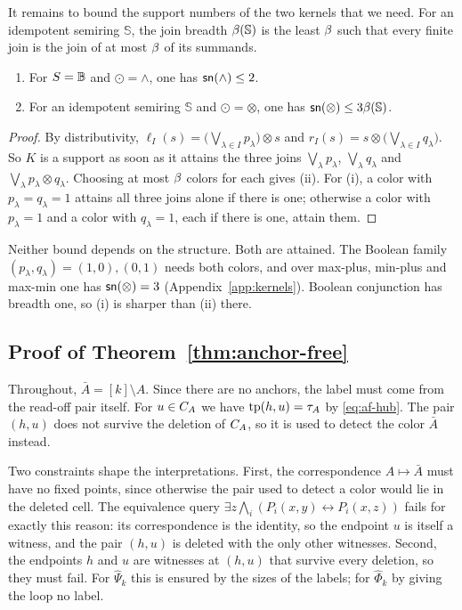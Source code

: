 It remains to bound the support numbers of the two kernels that we need.
For an idempotent semiring $\mathbb S$, the join breadth
$\beta(\mathbb S)$ is the least $\beta$ such that every finite join
is the join of at most $\beta$ of its summands.

\begin{lemma}\label{lem:af-width}
\begin{enumerate}[nosep,label=(\roman*)]
\item For $S=\mathbb B$ and $\odot=\land$, one has $\mathsf{sn}(\land)\le2$.
\item For an idempotent semiring $\mathbb S$ and $\odot=\otimes$, one has
 $\mathsf{sn}(\otimes)\le3\beta(\mathbb S)$.
\end{enumerate}
\end{lemma}
\begin{proof}
By distributivity, $\ell_I(s)=\bigl(\bigvee_{\lambda\in I}p_\lambda\bigr)
\otimes s$ and $r_I(s)=s\otimes\bigl(\bigvee_{\lambda\in I}q_\lambda\bigr)$.
So $K$ is a support as soon as it attains the three joins
$\bigvee_\lambda p_\lambda$, $\bigvee_\lambda q_\lambda$ and
$\bigvee_\lambda p_\lambda\otimes q_\lambda$. Choosing at most $\beta$
colors for each gives (ii). For (i), a color with
$p_\lambda=q_\lambda=1$ attains all three joins alone if there is one;
otherwise a color with $p_\lambda=1$ and a color with $q_\lambda=1$, each
if there is one, attain them.
\end{proof}
Neither bound depends on the structure. Both are attained. The Boolean
family $(p_\lambda,q_\lambda)=(1,0),(0,1)$ needs both colors, and over
max-plus, min-plus and max-min one has $\mathsf{sn}(\otimes)=3$
(Appendix~\ref{app:kernels}). Boolean conjunction has breadth one, so (i)
is sharper than (ii) there.

\subsection{Proof of Theorem~\ref{thm:anchor-free}}\label{app:af-proof}
Throughout, $\bar A=[k]\setminus A$. Since there are no anchors, the label
must come from the read-off pair itself. For $u\in C_{A}$ we have
$\operatorname{tp}(h,u)=\tau_{A}$ by \eqref{eq:af-hub}. The pair $(h,u)$ does not survive
the deletion of $C_{A}$, so it is used to detect the color $\bar A$
instead.

Two constraints shape the interpretations. First, the correspondence
$A\mapsto\bar A$ must have no fixed points, since otherwise the pair used
to detect a color would lie in the deleted cell. The equivalence query
$\exists z\bigwedge_i(P_i(x,y)\leftrightarrow P_i(x,z))$ fails for exactly
this reason: its correspondence is the identity, so the endpoint $u$ is
itself a witness, and the pair $(h,u)$ is deleted with the only other
witnesses. Second, the endpoints $h$ and $u$ are witnesses at $(h,u)$ that
survive every deletion, so they must fail. For $\widehat\Psi_k$ this is
ensured by the sizes of the labels; for $\widehat\Phi_k$ by giving the loop
no label.

